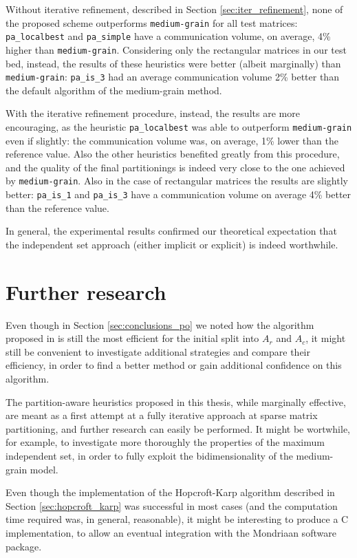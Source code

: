 Without iterative refinement, described in Section \ref{sec:iter_refinement}, none of the proposed scheme outperforms \verb|medium-grain| for all test matrices: \verb|pa_localbest| and \verb|pa_simple| have a communication volume, on average, 4\% higher than \verb|medium-grain|.  Considering only the rectangular matrices in our test bed, instead, the results of these heuristics were better (albeit marginally) than \verb|medium-grain|: \verb|pa_is_3| had an average communication volume 2\% better than the default algorithm of the medium-grain method.

With the iterative refinement procedure, instead, the results are more encouraging, as the heuristic \verb|pa_localbest| was able to outperform \verb|medium-grain| even if slightly: the communication volume was, on average, 1\% lower than the reference value. Also the other heuristics benefited greatly from this procedure, and the quality of the final partitionings is indeed very close to the one achieved by \verb|medium-grain|. Also in the case of rectangular matrices the results are slightly better: \verb|pa_is_1| and \verb|pa_is_3| have a communication volume on average 4\% better than the reference value.

In general, the experimental results confirmed our theoretical expectation that the independent set approach (either implicit or explicit) is indeed worthwhile.

\section{Further research}

Even though in Section \ref{sec:conclusions_po} we noted how the algorithm proposed in \cite{mediumgrain} is still the most efficient for the initial split into $A_r$ and $A_c$, it might still be convenient to investigate additional strategies and compare their efficiency, in order to find a better method or gain additional confidence on this algorithm.

The partition-aware heuristics proposed in this thesis, while marginally effective, are meant as a first attempt at a fully iterative approach at sparse matrix partitioning, and further research can easily be performed. It might be wortwhile, for example, to investigate more thoroughly the properties of the maximum independent set, in order to fully exploit the bidimensionality of the medium-grain model.

Even though the implementation of the Hopcroft-Karp algorithm described in Section \ref{sec:hopcroft_karp} was successful in most cases (and the computation time required was, in general, reasonable), it might be interesting to produce a C implementation, to allow an eventual integration with the Mondriaan software package. 

